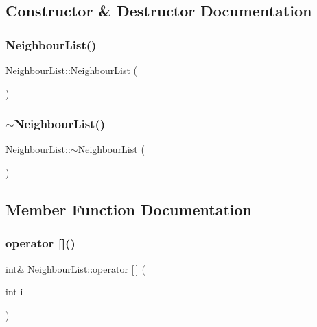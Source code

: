 \subsection{Constructor \& Destructor Documentation}
\mbox{\label{struct_neighbour_list_ab376c095d360ea03b0e499a8820bd0e7}} 
\subsubsection{\texorpdfstring{NeighbourList()}{NeighbourList()}}
{\footnotesize\ttfamily Neighbour\+List\+::\+Neighbour\+List (\begin{DoxyParamCaption}{ }\end{DoxyParamCaption})}

\mbox{\label{struct_neighbour_list_afcdbcc7fde83d4ce3a4fecc8d4105cd8}} 
\subsubsection{\texorpdfstring{$\sim$NeighbourList()}{~NeighbourList()}}
{\footnotesize\ttfamily Neighbour\+List\+::$\sim$\+Neighbour\+List (\begin{DoxyParamCaption}{ }\end{DoxyParamCaption})}



\subsection{Member Function Documentation}
\mbox{\label{struct_neighbour_list_a9bd6ad04ef1eb6ad9737ac493b6864d1}} 
\subsubsection{\texorpdfstring{operator []()}{operator []()}}
{\footnotesize\ttfamily int\& Neighbour\+List\+::operator \mbox{[}$\,$\mbox{]} (\begin{DoxyParamCaption}\item[{int}]{i }\end{DoxyParamCaption})\hspace{0.3cm}{\ttfamily [inline]}}

